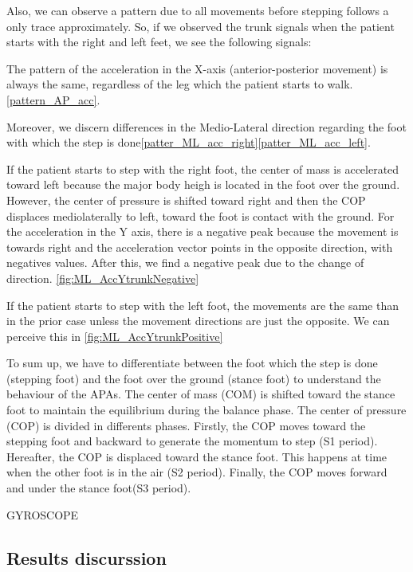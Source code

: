 Also, we can observe a pattern due to all movements before stepping follows a only trace approximately. So, if we observed the trunk signals when the patient starts with the right and left feet, we see the following signals:

The pattern of the acceleration in the X-axis (anterior-posterior movement) is always the same, regardless of the leg which the patient starts to walk. \ref{pattern_AP_acc}.

Moreover, we discern differences in the Medio-Lateral direction regarding the foot with which the step is done\ref{patter_ML_acc_right}\ref{patter_ML_acc_left}. 

If the patient starts to step with the right foot, the center of mass is accelerated toward left because the major body heigh is located in the foot over the ground. However, the center of pressure is shifted toward right and then the COP displaces mediolaterally to left, toward the foot is contact with the ground. For the acceleration in the Y axis, there is a negative peak because the movement is towards right and the acceleration vector points in the opposite direction, with negatives values. After this, we find a negative peak due to the change of direction. \ref{fig:ML_AccYtrunkNegative}

If the patient starts to step with the left foot, the movements are the same than in the prior case unless the movement directions are just the opposite. We can perceive this in \ref{fig:ML_AccYtrunkPositive}

To sum up, we have to differentiate between the foot which the step is done (stepping foot) and the foot over the ground (stance foot) to understand the behaviour of the APAs. The center of mass (COM) is shifted toward the stance foot to maintain the equilibrium during the balance phase. The center of pressure (COP) is divided in differents phases. Firstly, the COP moves toward the stepping foot and backward to generate the momentum to step (S1 period). Hereafter, the COP is displaced toward the stance foot. This happens at time when the other foot is in the air (S2 period). Finally, the COP moves forward and under the stance foot(S3 period). 
 
                 

GYROSCOPE


\subsection{Results discurssion}

